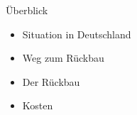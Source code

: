 


\frame{\maketitle}




\begin{frame}{ Überblick }
  \begin{itemize}
    \setlength\itemsep{1.2em}
      \item{ Situation in Deutschland }
      \item{ Weg zum Rückbau }
      \item{ Der Rückbau }
      \item{ Kosten }
  \end{itemize}
\end{frame}






